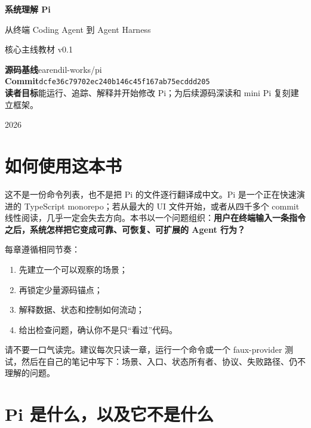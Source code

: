 \documentclass[UTF8,openany,11pt]{ctexbook}
\begin{document}
\frontmatter
\begin{titlepage}
\centering
\vspace*{2.5cm}
{\Huge\bfseries 系统理解 Pi\par}
\vspace{0.4cm}
{\Large 从终端 Coding Agent 到 Agent Harness\par}
\vspace{1.4cm}
{\large 核心主线教材 v0.1\par}
\vfill
\begin{tcolorbox}[colback=gray!5!white,colframe=gray!50!black,width=0.88\textwidth]
\textbf{源码基线}\quad earendil-works/pi\\
\textbf{Commit}\quad \texttt{dcfe36c79702ec240b146c45f167ab75ecddd205}\\
\textbf{读者目标}\quad 能运行、追踪、解释并开始修改 Pi；为后续源码深读和 mini Pi 复刻建立框架。
\end{tcolorbox}
\vspace{1cm}
{\large 2026\par}
\end{titlepage}

\chapter*{如何使用这本书}
这不是一份命令列表，也不是把 Pi 的文件逐行翻译成中文。Pi 是一个正在快速演进的 TypeScript monorepo；若从最大的 UI 文件开始，或者从四千多个 commit 线性阅读，几乎一定会失去方向。本书以一个问题组织：\textbf{用户在终端输入一条指令之后，系统怎样把它变成可靠、可恢复、可扩展的 Agent 行为？}

每章遵循相同节奏：
\begin{enumerate}
\item 先建立一个可以观察的场景；
\item 再锁定少量源码锚点；
\item 解释数据、状态和控制如何流动；
\item 给出检查问题，确认你不是只“看过”代码。
\end{enumerate}

请不要一口气读完。建议每次只读一章，运行一个命令或一个 faux-provider 测试，然后在自己的笔记中写下：场景、入口、状态所有者、协议、失败路径、仍不理解的问题。

\tableofcontents

\mainmatter

\chapter{Pi 是什么，以及它不是什么}
\end{document}
